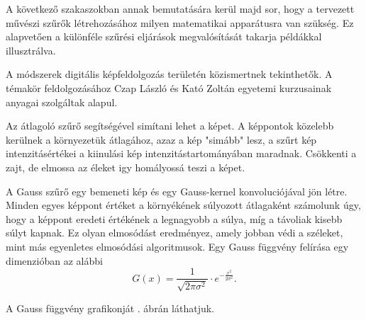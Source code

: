 


A következő szakaszokban annak bemutatására kerül majd sor, hogy a tervezett művészi szűrők létrehozásához milyen matematikai apparátusra van szükség. Ez alapvetően a különféle szűrési eljárások megvalósítását takarja példákkal illusztrálva.

A módszerek digitális képfeldolgozás területén közismertnek tekinthetők. A témakör feldolgozásához Czap László \cite{czap} és Kató Zoltán \cite{kato} egyetemi kurzusainak anyagai szolgáltak alapul.


Az átlagoló szűrő segítségével simítani lehet a képet. A képpontok közelebb kerülnek a környezetük átlagához, azaz a kép "simább" lesz, a szűrt kép intenzitásértékei a kiinulási kép intenzitástartományában maradnak. Csökkenti a zajt, de elmossa az éleket igy homályossá teszi a képet.




A Gauss szűrő egy bemeneti kép és egy Gauss-kernel konvoluciójával jön létre. Minden egyes képpont értéket a környékének súlyozott átlagaként számolunk úgy, hogy a képpont eredeti értékének a legnagyobb a súlya, míg a távoliak kisebb súlyt kapnak. Ez olyan elmosódást eredményez, amely jobban védi a széleket, mint más egyenletes elmosódási algoritmusok. Egy Gauss függvény felírása egy dimenzióban az alábbi
$$
G(x) =
\frac{1}{\sqrt{2\pi\sigma^{2}}}
\cdot e^{-\frac{x^{2}}{2\sigma^{2}}}.
$$

A Gauss függvény grafikonját . ábrán láthatjuk.


